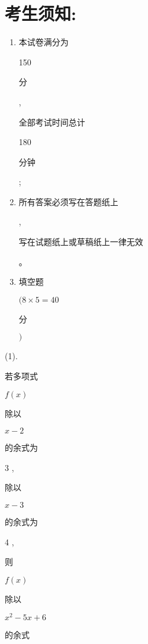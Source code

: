 \documentclass[10pt]{article}
\begin{document}
\section{考生须知:}
\begin{enumerate}
  \item \begin{CJK}{UTF8}{mj}本试卷满分为\end{CJK} 150 \begin{CJK}{UTF8}{mj}分\end{CJK}, \begin{CJK}{UTF8}{mj}全部考试时间总计\end{CJK} 180 \begin{CJK}{UTF8}{mj}分钟\end{CJK};

  \item \begin{CJK}{UTF8}{mj}所有答案必须写在答题纸上\end{CJK},\begin{CJK}{UTF8}{mj}写在试题纸上或草稿纸上一律无效\end{CJK}。

  \item \begin{CJK}{UTF8}{mj}填空题\end{CJK} $(8 \times 5=40$ \begin{CJK}{UTF8}{mj}分\end{CJK} $)$

\end{enumerate}
(1). \begin{CJK}{UTF8}{mj}若多项式\end{CJK} $f(x)$ \begin{CJK}{UTF8}{mj}除以\end{CJK} $x-2$ \begin{CJK}{UTF8}{mj}的余式为\end{CJK} 3 , \begin{CJK}{UTF8}{mj}除以\end{CJK} $x-3$ \begin{CJK}{UTF8}{mj}的余式为\end{CJK} 4 , \begin{CJK}{UTF8}{mj}则\end{CJK} $f(x)$ \begin{CJK}{UTF8}{mj}除以\end{CJK} $x^{2}-5 x+6$ \begin{CJK}{UTF8}{mj}的余式\end{CJK}
\end{document}
